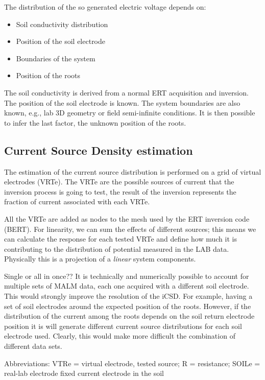 \documentclass{article}
\begin{document}
The distribution of the so generated electric voltage depends on:
\begin{itemize}
\item Soil conductivity distribution
\item Position of the soil electrode
\item Boundaries of the system
\item Position of the roots
\end{itemize}

The soil conductivity is derived from a normal ERT acquisition and inversion.
The position of the soil electrode is known. The system boundaries are also known, e.g., lab 3D geometry or field semi-infinite conditions.
It is then possible to infer the last factor, the unknown position of the roots.

\subsection{Current Source Density estimation}
The estimation of the current source distribution is performed on a grid of virtual electrodes (VRTe).
The VRTe are the possible sources of current that the inversion process is going to test, the result of the inversion represents the fraction of current associated with each VRTe.

All the VRTe are added as nodes to the mesh used by the ERT inversion code (BERT).
For linearity, we can sum the effects of different sources; this means we can calculate the response for each tested VRTe and define how much it is contributing to the distribution of potential measured in the LAB data. Physically this is a projection of a \textit{linear} system components.

Single or all in once??
It is technically and numerically possible to account for multiple sets of MALM data, each one acquired with a different soil electrode.
This would strongly improve the resolution of the iCSD. For example, having a set of soil electrodes around the expected position of the roots.
However, if the distribution of the current among the roots depends on the soil return electrode position it is will generate different current source distributions for each soil electrode used. Clearly, this would make more difficult the combination of different data sets.

Abbreviations:\newline
VTRe = virtual electrode, tested source; R = resistance; SOILe = real-lab electrode fixed current electrode in the soil
\end{document}
